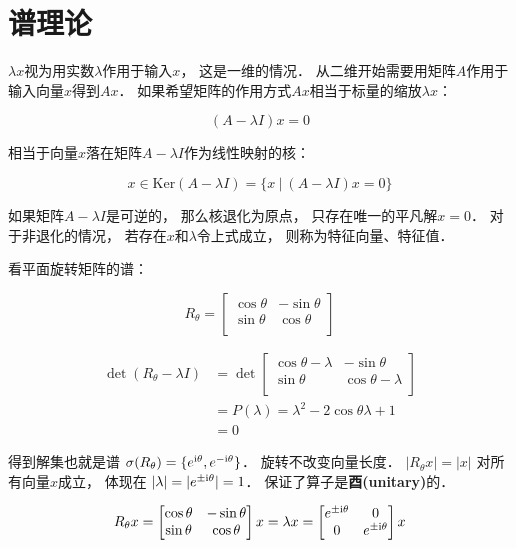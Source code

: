 \documentclass[10pt, openany]{book}
\begin{document}
\chapter{谱理论}

$\lambda x$视为用实数$\lambda$作用于输入$x$，
这是一维的情况．
从二维开始需要用矩阵$A$作用于输入向量$x$得到$Ax$．
如果希望矩阵的作用方式$Ax$相当于标量的缩放$\lambda x$：

$$
(A - \lambda I)x = 0
$$

相当于向量$x$落在矩阵$A - \lambda I$作为线性映射的核：

$$
x\in\text{Ker}(A - \lambda I) 
= \{x \ | \ (A - \lambda I)x = 0\}
$$

如果矩阵$A - \lambda I$是可逆的，
那么核退化为原点，
只存在唯一的平凡解$x=0$．
对于非退化的情况，
若存在$x$和$\lambda$令上式成立，
则称为特征向量、特征值．

看平面旋转矩阵的谱：

$$
R_\theta = \begin{bmatrix}
  \cos\theta & -\sin\theta \\
  \sin\theta & \cos\theta \\
\end{bmatrix}
$$

$$
\begin{aligned}
\det (R_\theta - \lambda I)
&=\det \begin{bmatrix}
  \cos\theta - \lambda & -\sin\theta \\
  \sin\theta & \cos\theta -\lambda \\
\end{bmatrix} \\
&=P(\lambda)
=\lambda^2 - 2\cos\theta \lambda + 1 \\
&=0
\end{aligned}
$$

得到解集也就是谱
$\sigma(R_\theta) = \{ e^{\text i\theta},e^{-\text i\theta} \}$．
旋转不改变向量长度．
$|R_\theta x| = |x|$
对所有向量$x$成立，
体现在
$|\lambda| = |e^{\pm\text i\theta}| = 1$．
保证了算子是\textbf{酉(unitary)}的．

$$
R_\theta x = \begin{bmatrix}
  \cos\theta & -\sin\theta \\
  \sin\theta & \cos\theta \\
\end{bmatrix}x
= \lambda x
= \begin{bmatrix}
  e^{\pm\text i\theta} & 0 \\
  0 & e^{\pm\text i\theta} \\
\end{bmatrix}x
$$
\end{document}
